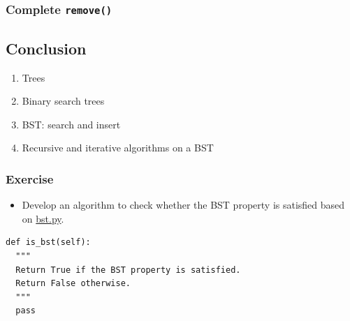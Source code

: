\documentclass[aspectratio=169, 14pt]{beamer}
\begin{document}
\begin{frame}
  \frametitle{Complete \texttt{remove()}}

\end{frame}

\begin{frame}
  
  \section{\textcolor{darkmidnightblue}{Conclusion}} 

  \begin{enumerate}
    \item Trees
    \item Binary search trees
    \item BST: search and insert
    \item Recursive and iterative algorithms on a BST
  \end{enumerate}
\end{frame}

\begin{frame}[fragile]
  \frametitle{Exercise}
\begin{itemize}
  \item Develop an algorithm to check whether the \alert{BST property} is satisfied based on \href{https://github.com/ChenZhongPu/data-structure-swufe/blob/master/code/python/tree/bst.py}{bst.py}. 
\end{itemize}

\begin{verbatim}
def is_bst(self):
  """
  Return True if the BST property is satisfied.
  Return False otherwise.
  """
  pass
\end{verbatim}

\end{frame}
\end{document}
